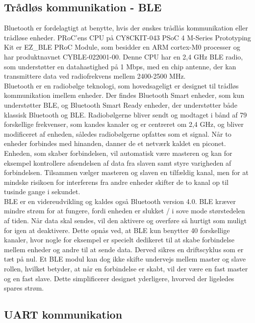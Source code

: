 \subsection{Trådløs kommunikation - BLE} 
Bluetooth er fordelagtigt at benytte, hvis der ønskes trådlås kommunikation eller trådløse enheder. PRoC'ens CPU på CY8CKIT-043 PSoC 4 M-Series Prototyping Kit er EZ\_BLE PRoC Module, som besidder en ARM cortex-M0 processer og har produktnavnet CYBLE-022001-00. Denne CPU har en 2,4 GHz BLE radio, som understøtter en datahastighed på 1 Mbps, med en chip antenne, der kan transmittere data ved radiofrekvens mellem 2400-2500 MHz. %
\citep{Semiconductor2016PRoC,Semiconductor2016BLEdyb}\\
Bluetooth er en radiobølge teknologi, som hovedsageligt er designet til trådløs kommunikation imellem enheder. Der findes Bluetooth Smart enheder, som kun understøtter BLE, og Bluetooth Smart Ready enheder, der understøtter både klassisk Bluetooth og BLE. Radiobølgerne bliver sendt og modtaget i bånd af 79 forskellige frekvenser, som kandes kanaler og er centreret om 2,4 GHz, og bliver modificeret af enheden, således radiobølgerne opfattes som et signal. Når to enheder forbindes med hinanden, danner de et netværk kaldet en piconet. Enheden, som skaber forbindelsen, vil automatisk være masteren og kan for eksempel kontrollere afsendelsen af data fra slaven samt styre varigheden af forbindelsen. Tilsammen vælger masteren og slaven en tilfældig kanal, men for at mindske risikoen for interferens fra andre enheder skifter de to kanal op til tusinde gange i sekundet. \citep{CYPRESS2016workshopBLE,Sauter2011} \\
BLE er en videreudvikling og kaldes også Bluetooth version 4.0. BLE kræver mindre strøm for at fungere, fordi enheden er slukket / i sove mode størstedelen af tiden. Når data skal sendes, vil den aktivere og overføre så hurtigt som muligt for igen at deaktivere. Dette opnås ved, at BLE kun benytter 40 forskellige kanaler, hvor nogle for eksempel er specielt dedikeret til at skabe forbindelse mellem enheder og andre til at sende data. Derved sikres en driftscyklus som er tæt på nul. Et BLE modul kan dog ikke skifte undervejs mellem master og slave rollen, hvilket betyder, at når en forbindelse er skabt, vil der være en fast master og en fast slave. Dette simplificerer designet yderligere, hvorved der ligeledes spares strøm. \citep{Gupta2013}

\subsection{UART kommunikation} %
%
%
%
%
